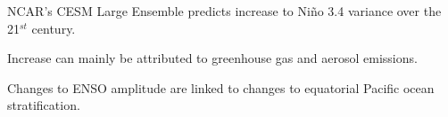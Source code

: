 \documentclass[draft]{agujournal2019}
\begin{document}





\begin{keypoints}
\item NCAR's CESM Large Ensemble predicts increase to Ni\~{n}o 3.4 variance over the 21$^{st}$ century.
\item Increase can mainly be attributed to greenhouse gas and aerosol emissions.
\item Changes to ENSO amplitude are linked to changes to equatorial Pacific ocean stratification.
\end{keypoints}

%
%

%
%

\end{document}
